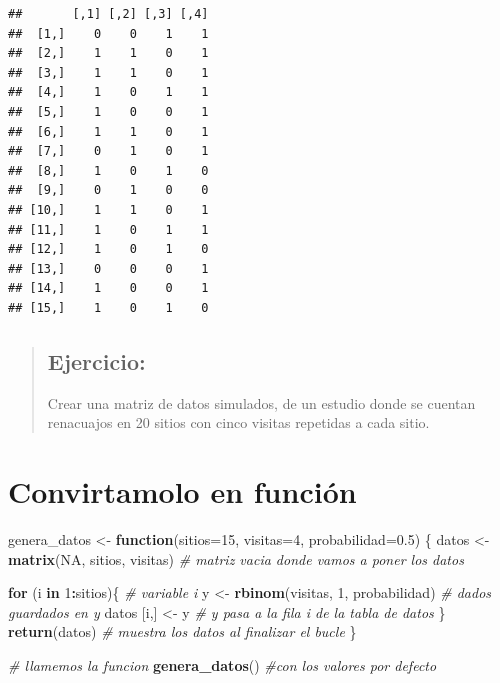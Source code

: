 \documentclass[
]{book}
\newenvironment{Shaded}{\begin{snugshade}}{\end{snugshade}}
\newcommand{\CommentTok}[1]{\textcolor[rgb]{0.56,0.35,0.01}{\textit{#1}}}
\newcommand{\ControlFlowTok}[1]{\textcolor[rgb]{0.13,0.29,0.53}{\textbf{#1}}}
\newcommand{\DataTypeTok}[1]{\textcolor[rgb]{0.13,0.29,0.53}{#1}}
\newcommand{\DecValTok}[1]{\textcolor[rgb]{0.00,0.00,0.81}{#1}}
\newcommand{\FloatTok}[1]{\textcolor[rgb]{0.00,0.00,0.81}{#1}}
\newcommand{\KeywordTok}[1]{\textcolor[rgb]{0.13,0.29,0.53}{\textbf{#1}}}
\newcommand{\NormalTok}[1]{#1}
\newcommand{\OperatorTok}[1]{\textcolor[rgb]{0.81,0.36,0.00}{\textbf{#1}}}
\newcommand{\OtherTok}[1]{\textcolor[rgb]{0.56,0.35,0.01}{#1}}
\newcommand{\StringTok}[1]{\textcolor[rgb]{0.31,0.60,0.02}{#1}}
\begin{document}
\begin{verbatim}
##       [,1] [,2] [,3] [,4]
##  [1,]    0    0    1    1
##  [2,]    1    1    0    1
##  [3,]    1    1    0    1
##  [4,]    1    0    1    1
##  [5,]    1    0    0    1
##  [6,]    1    1    0    1
##  [7,]    0    1    0    1
##  [8,]    1    0    1    0
##  [9,]    0    1    0    0
## [10,]    1    1    0    1
## [11,]    1    0    1    1
## [12,]    1    0    1    0
## [13,]    0    0    0    1
## [14,]    1    0    0    1
## [15,]    1    0    1    0
\end{verbatim}

\begin{quote}
\hypertarget{ejercicio-1}{%
\subsection{Ejercicio:}\label{ejercicio-1}}

Crear una matriz de datos simulados, de un estudio donde se cuentan renacuajos en 20 sitios con cinco visitas repetidas a cada sitio.
\end{quote}

\hypertarget{convirtamolo-en-funciuxf3n}{%
\section{Convirtamolo en función}\label{convirtamolo-en-funciuxf3n}}

\begin{Shaded}
\begin{Highlighting}[]
\NormalTok{genera_datos <-}\StringTok{ }\ControlFlowTok{function}\NormalTok{(}\DataTypeTok{sitios=}\DecValTok{15}\NormalTok{, }\DataTypeTok{visitas=}\DecValTok{4}\NormalTok{, }\DataTypeTok{probabilidad=}\FloatTok{0.5}\NormalTok{) \{}
\NormalTok{  datos <-}\StringTok{ }\KeywordTok{matrix}\NormalTok{(}\OtherTok{NA}\NormalTok{, sitios, visitas) }\CommentTok{# matriz vacia donde vamos a poner los datos}
  
  \ControlFlowTok{for}\NormalTok{ (i }\ControlFlowTok{in} \DecValTok{1}\OperatorTok{:}\NormalTok{sitios)\{     }\CommentTok{# variable i }
\NormalTok{    y <-}\StringTok{ }\KeywordTok{rbinom}\NormalTok{(visitas, }\DecValTok{1}\NormalTok{, probabilidad) }\CommentTok{# dados guardados en y}
\NormalTok{    datos [i,] <-}\StringTok{ }\NormalTok{y       }\CommentTok{# y pasa a la fila i de la tabla de datos}
\NormalTok{  \}  }
  \KeywordTok{return}\NormalTok{(datos) }\CommentTok{# muestra los datos al finalizar el bucle}
\NormalTok{\}                  }


\CommentTok{# llamemos la funcion }
\KeywordTok{genera_datos}\NormalTok{() }\CommentTok{#con los valores por defecto}
\end{Highlighting}
\end{Shaded}
\end{document}
